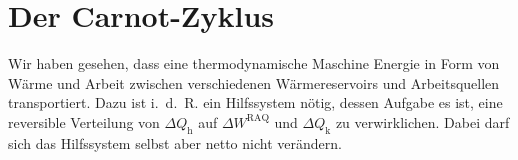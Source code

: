 \section{Der Carnot-Zyklus}

Wir haben gesehen, dass eine thermodynamische Maschine Energie in Form von Wärme und Arbeit zwischen verschiedenen Wärmereservoirs und Arbeitsquellen transportiert. Dazu ist i.~d.~R. ein Hilfssystem nötig, dessen Aufgabe es ist, eine reversible Verteilung von $\Delta Q_\mathrm{h}$ auf $\Delta W^\mathrm{RAQ}$ und $\Delta Q_\mathrm{k}$ zu verwirklichen. Dabei darf sich das Hilfssystem selbst aber netto nicht verändern. 

